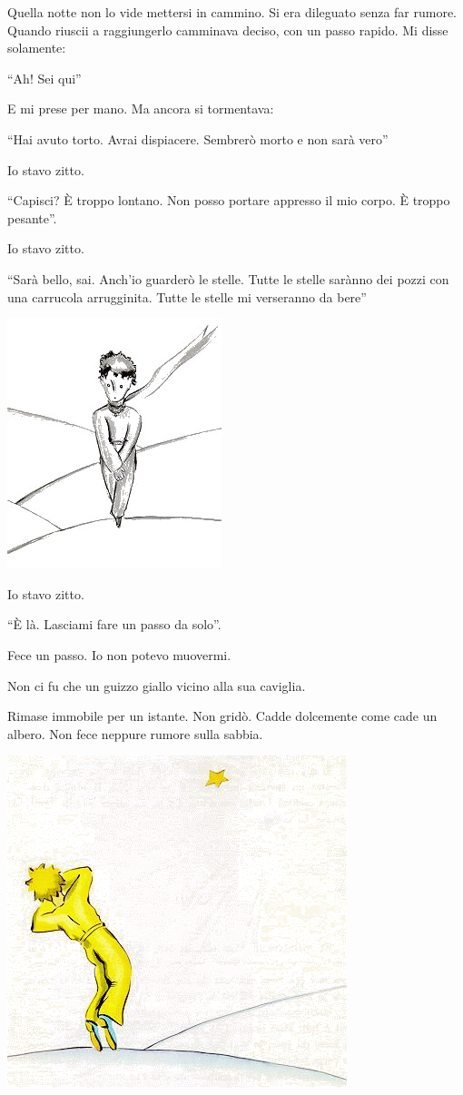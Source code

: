 \documentclass[11pt]{scrbook}
\begin{document}
Quella notte non lo vide mettersi in cammino. Si era dileguato senza far rumore. Quando riuscii a raggiungerlo camminava deciso, con un passo rapido. Mi disse solamente:

``Ah! Sei qui''

E mi prese per mano. Ma ancora si tormentava:

``Hai avuto torto. Avrai dispiacere. Sembrerò morto e non sarà vero''

Io stavo zitto.

``Capisci? È troppo lontano. Non posso portare appresso il mio corpo. È troppo pesante''.

Io stavo zitto.

``Sarà bello, sai. Anch'io guarderò le stelle. Tutte le stelle sarànno dei pozzi con una carrucola arrugginita. Tutte le stelle mi verseranno da bere''

\begin{center}
\includegraphics{img/26c}
\end{center}

Io stavo zitto.

``È là. Lasciami fare un passo da solo''.

Fece un passo. Io non potevo muovermi.

Non ci fu che un guizzo giallo vicino alla sua caviglia.

Rimase immobile per un istante. Non gridò. Cadde dolcemente come cade un albero. Non fece neppure rumore sulla sabbia.

\begin{center}
\includegraphics{img/zlaty}
\end{center}
\end{document}
